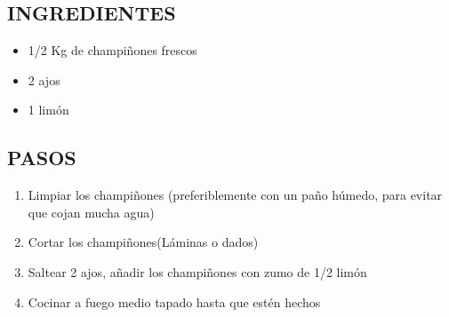 
\subsection*{INGREDIENTES}
\begin{itemize}
    \item 1/2 Kg de champiñones frescos
    \item 2 ajos
    \item 1 limón
\end{itemize}

\subsection*{PASOS}
\begin{enumerate}
    \item Limpiar los champiñones (preferiblemente con un paño húmedo, para evitar que cojan mucha agua)
    \item Cortar los champiñones(Láminas o dados)
    \item Saltear 2 ajos, añadir los champiñones con zumo de 1/2 limón
    \item Cocinar a fuego medio tapado hasta que estén hechos
\end{enumerate}
